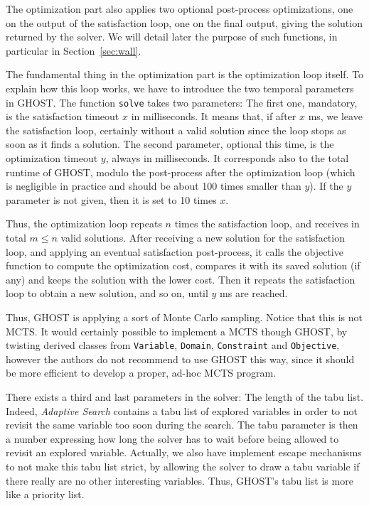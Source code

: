 \documentclass[journal]{IEEEtran}
\newcommand{\ghost}{\textsc{GHOST}\xspace}
\begin{document}
The  optimization   part  also   applies  two   optional  post-process
optimizations, one on the output of  the satisfaction loop, one on the
final output,  giving the  solution returned by  the solver.   We will
detail  later  the  purpose  of   such  functions,  in  particular  in
Section~\ref{sec:wall}.

The fundamental  thing in  the optimization  part is  the optimization
loop itself. To explain how this  loop works, we have to introduce the
two temporal  parameters in \ghost. The  function \texttt{solve} takes
two parameters: The first one,  mandatory, is the satisfaction timeout
$x$ in  milliseconds.  It means  that, if after  $x$ ms, we  leave the
satisfaction loop, certainly  without a valid solution  since the loop
stops as soon  as it finds a solution. The  second parameter, optional
this time, is the optimization timeout $y$, always in milliseconds. It
corresponds  also  to   the  total  runtime  of   \ghost,  modulo  the
post-process  after  the optimization  loop  (which  is negligible  in
practice and should  be about 100 times smaller than  $y$). If the $y$
parameter is not given, then it is set to 10 times $x$.

Thus, the optimization  loop repeats $n$ times  the satisfaction loop,
and receives  in total $m \leq  n$ valid solutions. After  receiving a
new  solution for  the  satisfaction loop,  and  applying an  eventual
satisfaction post-process, it calls  the objective function to compute
the optimization  cost, compares it  with its saved solution  (if any)
and  keeps the  solution with  the lower  cost.  Then  it repeats  the
satisfaction loop  to obtain a new  solution, and so on,  until $y$ ms
are reached.

Thus, \ghost is  applying a sort of Monte Carlo  sampling. Notice that
this is  not MCTS.  It  would certainly  possible to implement  a MCTS
though  \ghost, by  twisting derived  classes from  \texttt{Variable},
\texttt{Domain},  \texttt{Constraint} and  \texttt{Objective}, however
the authors do  not recommend to use \ghost this  way, since it should
be more efficient to develop a proper, ad-hoc MCTS program.

There exists a third and last  parameters in the solver: The length of
the tabu list.  Indeed, {\it Adaptive  Search} contains a tabu list of
explored variables in order to not  revisit the same variable too soon
during the search. The tabu parameter  is then a number expressing how
long  the solver  has  to  wait before  being  allowed  to revisit  an
explored variable. Actually, we  also have implement escape mechanisms
to not make  this tabu list strict,  by allowing the solver  to draw a
tabu   variable   if   there   really   are   no   other   interesting
variables. Thus, \ghost's tabu list is more like a priority list.
\end{document}
